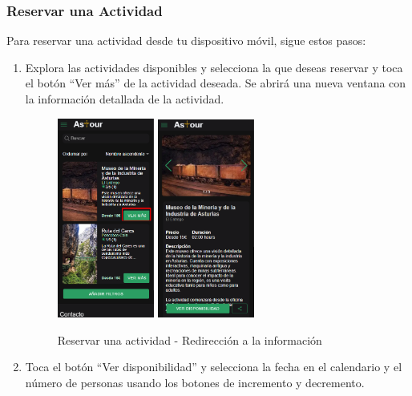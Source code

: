 \subsubsection{Reservar una Actividad}
Para reservar una actividad desde tu dispositivo móvil, sigue estos pasos:

\begin{enumerate}
	\item Explora las actividades disponibles y selecciona la que deseas reservar y toca el botón “Ver más” de la actividad deseada. Se abrirá una nueva ventana con la información detallada de la actividad.
	      \begin{figure}[H]
		      \centering
		      \includegraphics[width=0.3\textwidth]{7-Construccion/Manuales/mobile/ver mas.png}
		      \includegraphics[width=0.3\textwidth]{7-Construccion/Manuales/mobile/detalles.png}
		      \caption{Reservar una actividad - Redirección a la información }
	      \end{figure}
	\item Toca el botón “Ver disponibilidad” y selecciona la fecha en el calendario y el número de personas usando los botones de incremento y decremento.

\end{enumerate}
